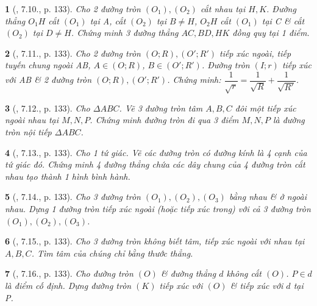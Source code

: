 \documentclass{article}
\newtheorem{baitoan}{}
\begin{document}
\begin{baitoan}[\cite{Binh_boi_duong_Toan_9_tap_1}, 7.10., p. 133]
	 Cho 2 đường tròn $(O_1),(O_2)$ cắt nhau tại $H,K$. Đường thẳng $O_1H$ cắt $(O_1)$ tại A, cắt $(O_2)$ tại $B\ne H$, $O_2H$ cắt $(O_1)$ tại C \& cắt $(O_2)$ tại $D\ne H$. Chứng minh 3 đường thẳng $AC,BD,HK$ đồng quy tại 1 điểm.
\end{baitoan}

\begin{baitoan}[\cite{Binh_boi_duong_Toan_9_tap_1}, 7.11., p. 133]
	Cho 2 đường tròn $(O;R),(O';R')$ tiếp xúc ngoài, tiếp tuyến chung ngoài AB, $A\in(O;R)$, $B\in(O';R')$. Đường tròn $(I;r)$ tiếp xúc với AB \& 2 đường tròn $(O;R),(O';R')$. Chứng minh: $\dfrac{1}{\sqrt{r}} = \dfrac{1}{\sqrt{R}} + \dfrac{1}{\sqrt{R'}}$.
\end{baitoan}

\begin{baitoan}[\cite{Binh_boi_duong_Toan_9_tap_1}, 7.12., p. 133]
	Cho $\Delta ABC$. Vẽ 3 đường tròn tâm $A,B,C$ đôi một tiếp xúc ngoài nhau tại $M,N,P$. Chứng minh đường tròn đi qua 3 điểm $M,N,P$ là đường tròn nội tiếp $\Delta ABC$.
\end{baitoan}

\begin{baitoan}[\cite{Binh_boi_duong_Toan_9_tap_1}, 7.13., p. 133]
	Cho 1 tứ giác. Vẽ các đường tròn có đường kính là 4 cạnh của tứ giác đó. Chứng minh 4 đường thẳng chứa các dây chung của 4 đường tròn cắt nhau tạo thành 1 hình bình hành.
\end{baitoan}

\begin{baitoan}[\cite{Binh_boi_duong_Toan_9_tap_1}, 7.14., p. 133]
	Cho 3 đường tròn $(O_1),(O_2),(O_3)$ bằng nhau \& ở ngoài nhau. Dựng 1 đường tròn tiếp xúc ngoài (hoặc tiếp xúc trong) với cả 3 đường tròn $(O_1),(O_2),(O_3)$.
\end{baitoan}

\begin{baitoan}[\cite{Binh_boi_duong_Toan_9_tap_1}, 7.15., p. 133]
	Cho 3 đường tròn không biết tâm, tiếp xúc ngoài với nhau tại $A,B,C$. Tìm tâm của chúng chỉ bằng thước thẳng.
\end{baitoan}

\begin{baitoan}[\cite{Binh_boi_duong_Toan_9_tap_1}, 7.16., p. 133]
	Cho đường tròn $(O)$ \& đường thẳng $d$ không cắt $(O)$. $P\in d$ là điểm cố định. Dựng đường tròn $(K)$ tiếp xúc với $(O)$ \& tiếp xúc với $d$ tại P.
\end{baitoan}
\end{document}
